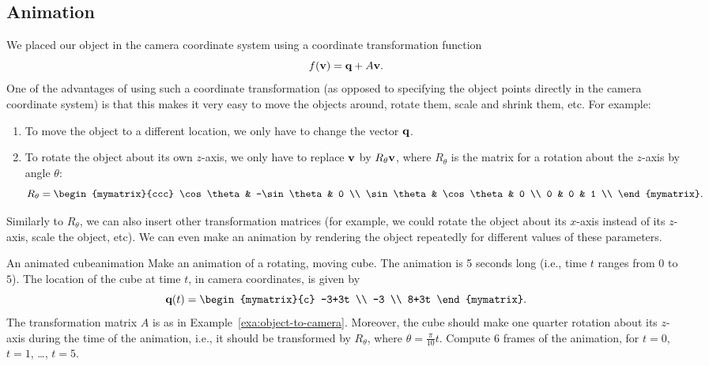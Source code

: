\subsection*{Animation}

We placed our object in the camera coordinate system using a
coordinate transformation function
\begin{equation*}
  f(\vect{v}) = \vect{q} + A\vect{v}.
\end{equation*}
One of the advantages of using such a coordinate transformation (as
opposed to specifying the object points directly in the camera
coordinate system) is that this makes it very easy to move the objects
around, rotate them, scale and shrink them, etc. For example:
\begin{enumerate}
\item To move the object to a different location, we only have to
  change the vector $\vect{q}$.
\item To rotate the object about its own $z$-axis, we only have to
  replace $\vect{v}$ by $R_{\theta}\vect{v}$, where $R_{\theta}$ is the matrix for a
  rotation about the $z$-axis by angle $\theta$:
  \begin{equation*}
    R_{\theta} = \begin{mymatrix}{ccc}
      \cos\theta & -\sin\theta & 0 \\
      \sin\theta & \cos\theta & 0 \\
      0 & 0 & 1 \\
    \end{mymatrix}.
  \end{equation*}
\end{enumerate}
Similarly to $R_{\theta}$, we can also insert other transformation
matrices (for example, we could rotate the object about its $x$-axis
instead of its $z$-axis, scale the object, etc).  We can even make an
animation by rendering the object repeatedly for different values of
these parameters.

\begin{example}{An animated cube}{animation}
  Make an animation of a rotating, moving cube. The animation is 5
  seconds long (i.e., time $t$ ranges from $0$ to $5$). The location
  of the cube at time $t$, in camera coordinates, is given by
  \begin{equation*}
    \vect{q}(t) =
    \begin{mymatrix}{c} -3+3t \\ -3 \\ 8+3t \end{mymatrix}.
  \end{equation*}
  The transformation matrix $A$ is as in
  Example~\ref{exa:object-to-camera}. Moreover, the cube should make
  one quarter rotation about its $z$-axis during the time of the
  animation, i.e., it should be transformed by $R_{\theta}$, where
  $\theta=\frac{\pi}{10}t$. Compute $6$ frames of the animation, for
  $t=0$, $t=1$, \ldots, $t=5$.
\end{example}

